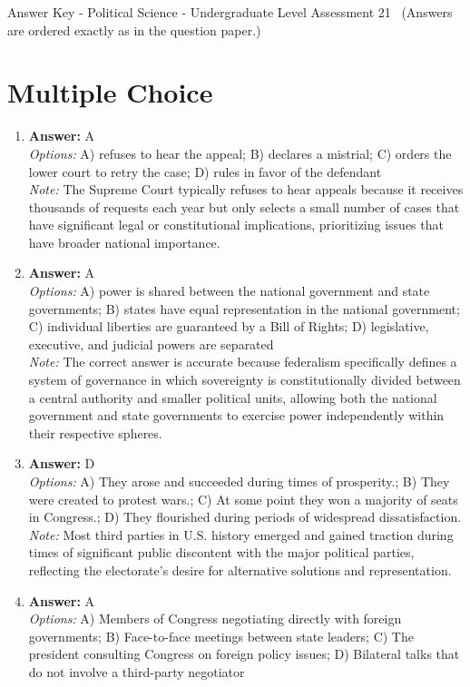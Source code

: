 \documentclass[12pt]{article}
\begin{document}
\begin{center}
Answer Key - Political Science - Undergraduate Level Assessment 21 \
\small (Answers are ordered exactly as in the question paper.)
\end{center}

\section*{Multiple Choice}
\begin{enumerate}[label=\arabic*.]
\item \textbf{Answer:} A
\\ \textit{Options:} A) refuses to hear the appeal; B) declares a mistrial; C) orders the lower court to retry the case; D) rules in favor of the defendant
\\ \textit{Note:} The Supreme Court typically refuses to hear appeals because it receives thousands of requests each year but only selects a small number of cases that have significant legal or constitutional implications, prioritizing issues that have broader national importance.
\item \textbf{Answer:} A
\\ \textit{Options:} A) power is shared between the national government and state governments; B) states have equal representation in the national government; C) individual liberties are guaranteed by a Bill of Rights; D) legislative, executive, and judicial powers are separated
\\ \textit{Note:} The correct answer is accurate because federalism specifically defines a system of governance in which sovereignty is constitutionally divided between a central authority and smaller political units, allowing both the national government and state governments to exercise power independently within their respective spheres.
\item \textbf{Answer:} D
\\ \textit{Options:} A) They arose and succeeded during times of prosperity.; B) They were created to protest wars.; C) At some point they won a majority of seats in Congress.; D) They flourished during periods of widespread dissatisfaction.
\\ \textit{Note:} Most third parties in U.S. history emerged and gained traction during times of significant public discontent with the major political parties, reflecting the electorate's desire for alternative solutions and representation.
\item \textbf{Answer:} A
\\ \textit{Options:} A) Members of Congress negotiating directly with foreign governments; B) Face-to-face meetings between state leaders; C) The president consulting Congress on foreign policy issues; D) Bilateral talks that do not involve a third-party negotiator

\end{enumerate}
\end{document}
